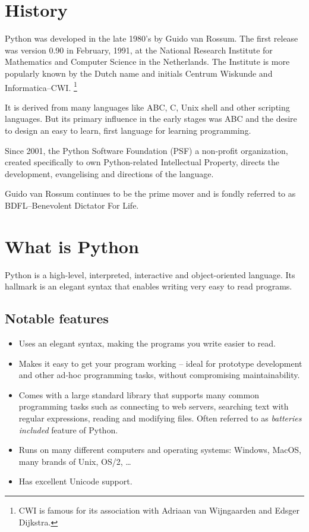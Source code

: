 \documentclass[11pt,a4paper]{article}
\author{TalentSprint}
\date{}
\begin{document}
\section*{History}

Python was developed in the late 1980's by Guido van Rossum. The first release was version 0.90 in February, 1991, at the National Research Institute for Mathematics and Computer Science in the Netherlands. The Institute is more popularly known by the Dutch name and initials Centrum Wiskunde and Informatica--CWI. \footnote{CWI is famous for its association with Adriaan van Wijngaarden and Edsger Dijkstra.}

It is derived from many languages like ABC, C, Unix shell and other scripting languages. But its primary influence in the early stages was ABC and the desire to design an easy to learn, first language for learning programming.

Since 2001, the Python Software Foundation (PSF) a non-profit organization, created specifically to own Python-related Intellectual Property, directs the development, evangelising and directions of the language.

Guido van Rossum continues to be the prime mover and is fondly referred to as BDFL--Benevolent Dictator For Life.

\section*{What is Python}
Python is a high-level, interpreted, interactive and object-oriented language. Its hallmark is an elegant syntax that enables writing very easy to read programs.

\subsection*{Notable features}
\begin{itemize}
    \item Uses an elegant syntax, making the programs you write easier to read.
    \item Makes it easy to get your program working -- ideal for prototype development and other ad-hoc programming tasks, without compromising maintainability.
    \item Comes with a large standard library that supports many common programming tasks such as connecting to web servers, searching text with regular expressions, reading and modifying files. Often referred to as \emph{batteries included} feature of Python.
    \item Runs on many different computers and operating systems: Windows, MacOS, many brands of Unix, OS/2, \ldots
    \item Has excellent Unicode support.
\end{itemize}   
\end{document}
